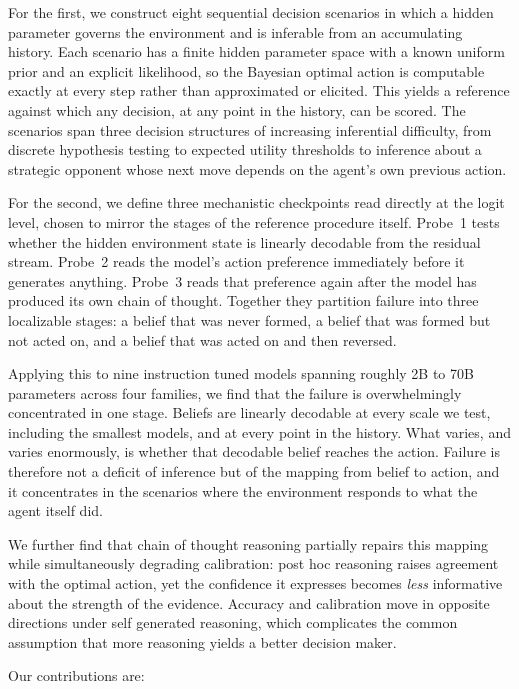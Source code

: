 For the first, we construct eight sequential decision scenarios in which a
hidden parameter governs the environment and is inferable from an accumulating
history. Each scenario has a finite hidden parameter space with a known uniform
prior and an explicit likelihood, so the Bayesian optimal action is computable
exactly at every step rather than approximated or elicited. This yields a
reference against which any decision, at any point in the history, can be
scored. The scenarios span three decision structures of increasing inferential
difficulty, from discrete hypothesis testing to expected utility thresholds to
inference about a strategic opponent whose next move depends on the agent's own
previous action.

For the second, we define three mechanistic checkpoints read directly at the
logit level, chosen to mirror the stages of the reference procedure itself.
Probe~1 tests whether the hidden environment state is linearly decodable from
the residual stream. Probe~2 reads the model's action preference immediately
before it generates anything. Probe~3 reads that preference again after the
model has produced its own chain of thought. Together they partition failure
into three localizable stages: a belief that was never formed, a belief that
was formed but not acted on, and a belief that was acted on and then reversed.

Applying this to nine instruction tuned models spanning roughly 2B to 70B
parameters across four families, we find that the failure is overwhelmingly
concentrated in one stage. Beliefs are linearly decodable at every scale we
test, including the smallest models, and at every point in the history. What
varies, and varies enormously, is whether that decodable belief reaches the
action. Failure is therefore not a deficit of inference but of the mapping from
belief to action, and it concentrates in the scenarios where the environment
responds to what the agent itself did.

We further find that chain of thought reasoning partially repairs this mapping
while simultaneously degrading calibration: post hoc reasoning raises agreement
with the optimal action, yet the confidence it expresses becomes \emph{less}
informative about the strength of the evidence. Accuracy and calibration move
in opposite directions under self generated reasoning, which complicates the
common assumption that more reasoning yields a better decision maker.

Our contributions are:

